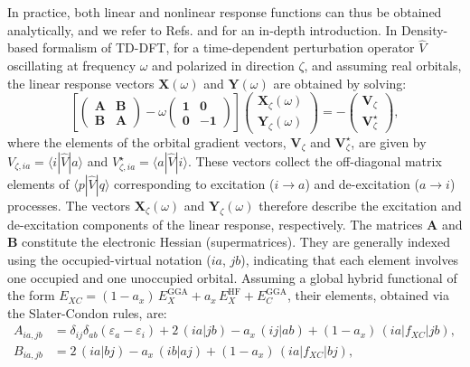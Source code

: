 \documentclass[%
 aip,
 amsmath,amssymb,
preprint,%
]{revtex4-2}
\begin{document}
In practice, both linear and nonlinear response functions can thus be obtained analytically, and we refer to Refs.  and  for an in-depth introduction. 
In Density-based formalism of TD-DFT, for a time-dependent perturbation operator $\hat V$ oscillating at frequency $\omega$ and polarized in direction $\zeta$, and assuming real orbitals, the linear response vectors $\mathbf X(\omega)$ and $\mathbf Y(\omega)$ are obtained by solving:
\begin{equation}
	\left[
	\begin{pmatrix}
		\mathbf{A} & \mathbf{B} \\
		\mathbf{B} & \mathbf{A}
	\end{pmatrix}
	- \omega
	\begin{pmatrix}
		\mathbf{1} & \mathbf{0} \\
		\mathbf{0} & -\mathbf{1}
	\end{pmatrix}
	\right]
	\begin{pmatrix}
		\mathbf{X}_\zeta(\omega) \\
		\mathbf{Y}_\zeta(\omega)
	\end{pmatrix}
	=
	-\begin{pmatrix}
		\mathbf{V}_\zeta \\
		\mathbf{V}_\zeta^\star
	\end{pmatrix},
	\label{eq:response}
\end{equation}
where the elements of the orbital gradient vectors, $\mathbf{V}_\zeta$ and $\mathbf{V}_\zeta^\star$, are given by ${V}_{\zeta, ia} = \langle i | \hat{V} | a \rangle$ and ${V}_{\zeta, ia}^\star = \langle a | \hat{V} | i \rangle$. 
These vectors collect the off-diagonal matrix elements of $\langle p | \hat{V} | q \rangle$ corresponding to excitation ($i \to a$) and de-excitation ($a \to i$) processes. 
The vectors $\mathbf{X}_\zeta(\omega)$ and $\mathbf{Y}_\zeta(\omega)$ therefore describe the excitation and de-excitation components of the linear response, respectively.
The matrices $\mathbf{A}$ and $\mathbf{B}$ constitute the electronic Hessian (supermatrices). 
They are generally indexed using the occupied-virtual notation ($ia$, $jb$), indicating that each element involves one occupied and one unoccupied orbital. 
Assuming a global hybrid functional of the form $E_{XC} = (1-a_x)\,E_X^{\mathrm{GGA}} + a_x\,E_X^{\mathrm{HF}} + E_C^{\mathrm{GGA}}$, their elements, obtained via the Slater-Condon rules, are:
\begin{align}
	A_{ia,jb} &= \delta_{ij}\delta_{ab} (\varepsilon_a - \varepsilon_i)
	+ 2\,(ia|jb)
	- a_x\,(ij|ab)
	+ (1-a_x)\,(ia|f_{XC}|jb),
	\nonumber \\
	B_{ia,jb} &= 2\,(ia|bj)
	- a_x\,(ib|aj)
	+ (1-a_x)\,(ia|f_{XC}|bj),
	\label{eq:TD-AandB}
\end{align}
\end{document}
